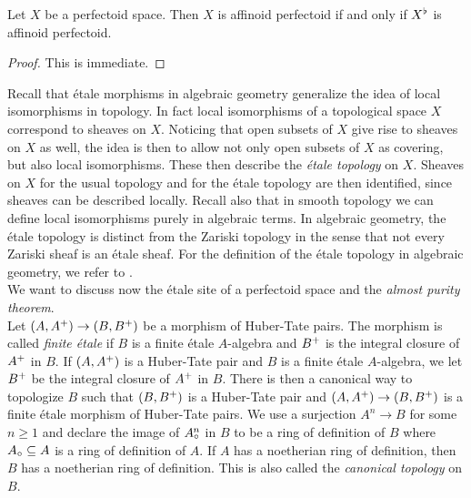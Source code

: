 \begin{cor}
Let $X$ be a perfectoid space. Then $X$ is affinoid perfectoid if and only if $X^{\flat}$ is affinoid perfectoid.
\end{cor}
\begin{proof}
This is immediate.
\end{proof}


Recall that \'etale morphisms in algebraic geometry generalize the idea of local isomorphisms in topology. In fact local isomorphisms of a topological space $X$ correspond to sheaves on $X$.
Noticing that open subsets of $X$ give rise to sheaves on $X$ as well, the idea is then to allow not only open subsets of $X$ as covering, but also local isomorphisms. These then describe the \emph{\'etale topology} on $X$. 
Sheaves on $X$ for the usual topology and for the \'etale topology are then identified, since sheaves can be described locally. Recall also that in smooth topology we can define local isomorphisms purely in algebraic terms.
In algebraic geometry, the \'etale topology is distinct from the Zariski topology in the sense that not every Zariski sheaf is an \'etale sheaf.
For the definition of the \'etale topology in algebraic geometry, we refer to \cite{Tamme94}. \\



We want to discuss now the  \'etale site of a perfectoid space and the \emph{almost purity theorem}. \\

Let $(A, A{^{+}})\to(B, B{^{+}})$ be a morphism of Huber-Tate pairs.
The morphism is called \emph{finite \'etale} if $B$ is a finite \'etale $A$-algebra
and $B{^{+}}$ is the integral closure of $A{^{+}}$ in $B$. 
If $(A, A{^{+}})$ is a Huber-Tate pair and $B$ is a finite \'etale $A$-algebra, we let $B{^{+}}$ be the integral closure of 
$A{^{+}}$ in $B$. There is then a canonical way to topologize $B$ such that $(B, B{^{+}})$ is a  Huber-Tate pair and $(A,A{^{+}})\to(B,B{^{+}})$ is a finite \'etale morphism of Huber-Tate pairs. 
We use a surjection $A^n\to B$ for some $n\geq1$ and declare the image of $A{_{\circ}}\!\!\!^n$ in $B$ to be a ring of definition of $B$ where $A{_{\circ}}\subseteq A$ is a ring of definition of $A$.
 If $A$ has a noetherian ring of definition, then $B$ has a noetherian ring of definition. This is also called the \emph{canonical topology} on $B$.\\


